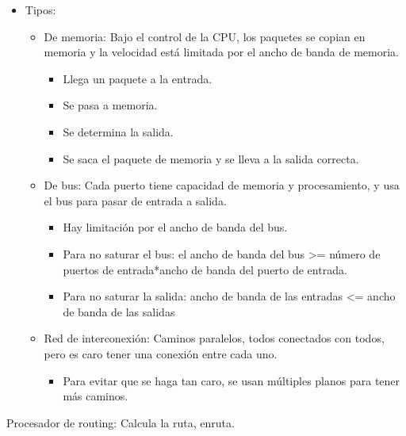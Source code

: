 \documentclass[12pt, twoside, openright]{report} %
\begin{document}
\begin{itemize}
	\item Tipos:

	      \begin{itemize}
		      \item De memoria: Bajo el control de la CPU, los paquetes se copian en
		            memoria y la velocidad está limitada por el ancho de banda de
		            memoria.
		            \begin{itemize}
			            \item Llega un paquete a la entrada.
			            \item Se pasa a memoria.
			            \item Se determina la salida.
			            \item Se saca el paquete de memoria y se lleva a la salida correcta.
		            \end{itemize}
		      \item De bus: Cada puerto tiene capacidad de memoria y procesamiento,
		            y usa el bus para pasar de entrada a salida.
		            \begin{itemize}
			            \item Hay limitación por el ancho de banda del bus.
			            \item Para no saturar el bus: el ancho de banda del bus
			                  \textgreater= número de puertos de entrada*ancho de banda del
			                  puerto de entrada.
			            \item Para no saturar la salida: ancho de banda de las entradas
			                  \textless= ancho de banda de las salidas
		            \end{itemize}
		      \item Red de interconexión: Caminos paralelos, todos conectados con
		            todos, pero es caro tener una conexión entre cada uno.

		            \begin{itemize}
			            \item Para evitar que se haga tan caro, se usan múltiples planos
			                  para tener más caminos.
		            \end{itemize}


	      \end{itemize}
\end{itemize}

Procesador de routing: Calcula la ruta, enruta.
\end{document}
